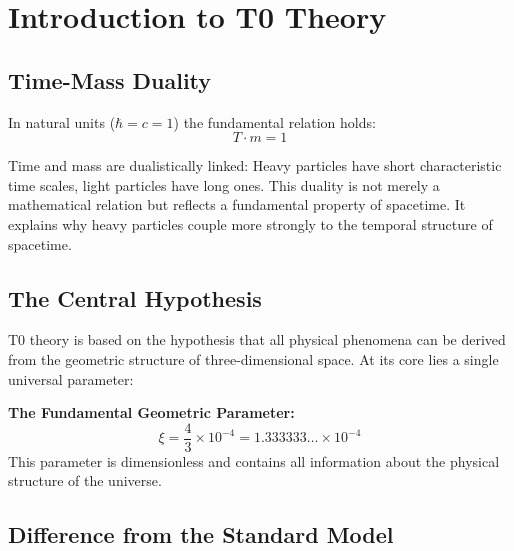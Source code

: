	
	\section{Introduction to T0 Theory}
	
	\subsection{Time-Mass Duality}
	
	In natural units ($\hbar = c = 1$) the fundamental relation holds:
	\begin{equation}
		T \cdot m = 1
		\label{eq:time_mass_duality}
	\end{equation}
	
	Time and mass are dualistically linked: Heavy particles have short characteristic time scales, light particles have long ones. This duality is not merely a mathematical relation but reflects a fundamental property of spacetime. It explains why heavy particles couple more strongly to the temporal structure of spacetime.
	
	\subsection{The Central Hypothesis}
	
	T0 theory is based on the hypothesis that all physical phenomena can be derived from the geometric structure of three-dimensional space. At its core lies a single universal parameter:
	
	\begin{foundation}
		\textbf{The Fundamental Geometric Parameter:}
		\begin{equation}
			\boxed{\xi = \frac{4}{3} \times 10^{-4} = 1.333333\dots \times 10^{-4}}
			\label{eq:xi_fundamental}
		\end{equation}
		This parameter is dimensionless and contains all information about the physical structure of the universe.
	\end{foundation}
	
	\subsection{Difference from the Standard Model}
	
